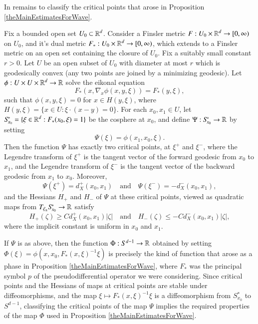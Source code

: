 In remains to classify the critical points that arose in Proposition \ref{theMainEstimatesForWave}.

\begin{prop} \label{triangleLemma}
    Fix a bounded open set $U_0 \subset \operatorname{\mathbb{R}}^d$. Consider a Finsler metric $F: U_0 \times \operatorname{\mathbb{R}}^d \to [0,\infty)$ on $U_0$, and it's dual metric $F_*: U_0 \times \operatorname{\mathbb{R}}^d \to [0,\infty)$, which extends to a Finsler metric on an open set containing the closure of $U_0$. Fix a suitably small constant $r > 0$. Let $U$ be an open subset of $U_0$ with diameter at most $r$ which is geodesically convex (any two points are joined by a minimizing geodesic). Let $\phi: U \times U \times \operatorname{\mathbb{R}}^d \to \operatorname{\mathbb{R}}$ solve the eikonal equation
    \[ F_* ( x, \nabla_x \phi(x,y,\xi) ) = F_*(y,\xi), \]
    such that $\phi(x,y,\xi) = 0$ for $x \in H(y,\xi)$, where $H(y, \xi) = \{ x \in U : \xi \cdot (x - y) = 0 \}$. For each $x_0,x_1 \in U$, let $S\!_{x_0}^* = \{ \xi \in \operatorname{\mathbb{R}}^d: F_*(x_0,\xi) = 1 \}$ be the cosphere at $x_0$, and define $\Psi: S\!_{x_0}^* \to \operatorname{\mathbb{R}}$ by setting
    \[ \Psi(\xi) = \phi(x_1,x_0,\xi). \]
    Then the function $\Psi$ has exactly two critical points, at $\xi^+$ and $\xi^-$, where the Legendre transform of $\xi^+$ is the tangent vector of the forward geodesic from $x_0$ to $x_1$, and the Legendre transform of $\xi^-$ is the tangent vector of the backward geodesic from $x_1$ to $x_0$. Moreover,
    \[ \Psi(\xi^+) = d_X^+(x_0,x_1) \quad\text{and}\quad \Psi(\xi^-) = - d_X^-(x_0,x_1), \]
    and the Hessians $H_+$ and $H_-$ of $\Psi$ at these critical points, viewed as quadratic maps from $T_{\xi_{\pm}} S\!_{x_0}^* \to \operatorname{\mathbb{R}}$ satisfy
    \[ H_+(\zeta) \geq C d_X^+(x_0,x_1) |\zeta| \quad\text{and}\quad H_-(\zeta) \leq - C d_X^-(x_0,x_1) |\zeta|, \]
    where the implicit constant is uniform in $x_0$ and $x_1$.
\end{prop}

If $\Psi$ is as above, then the function $\Phi: S^{d-1} \to \operatorname{\mathbb{R}}$ obtained by setting $\Phi(\xi) = \phi( x, x_0, F_*(x,\xi)^{-1} \xi  )$ is precisely the kind of function that arose as a phase in Proposition \ref{theMainEstimatesForWave}, where $F_*$ was the principal symbol $p$ of the pseudodifferential operator we were considering. Since critical points and the Hessians of maps at critical points are stable under diffeomorphisms, %
and the map $\xi \mapsto F_*(x,\xi)^{-1} \xi$ is a diffeomorphism from $S\!_{x_0}^*$ to $S^{d-1}$, classifying the critical points of the map $\Psi$ implies the required properties of the map $\Phi$ used in Proposition \ref{theMainEstimatesForWave}.

